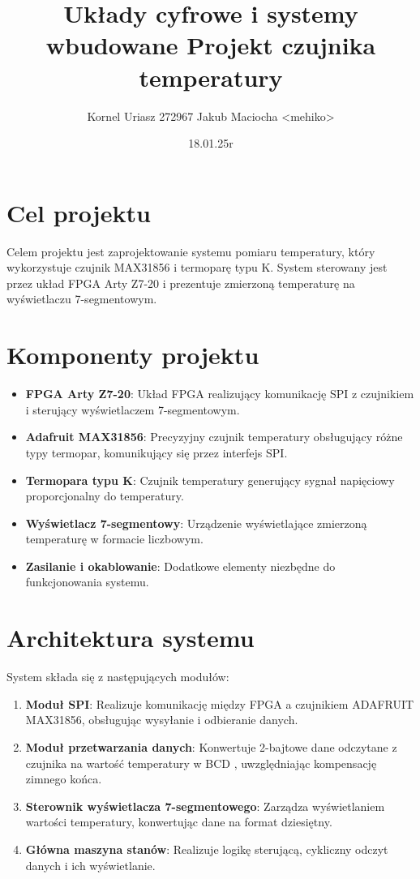 \documentclass[a4paper,12pt]{article}
\title{Układy cyfrowe i systemy wbudowane \newline Projekt czujnika temperatury}
\author{Kornel Uriasz 272967 \newline Jakub Maciocha <mehiko>}
\date{18.01.25r}
\begin{document}
\maketitle

\section{Cel projektu}
Celem projektu jest zaprojektowanie systemu pomiaru temperatury, który wykorzystuje czujnik MAX31856 i termoparę typu K. System sterowany jest przez układ FPGA Arty Z7-20 i prezentuje zmierzoną temperaturę na wyświetlaczu 7-segmentowym.

\section{Komponenty projektu}
\begin{itemize}
    \item \textbf{FPGA Arty Z7-20}: Układ FPGA realizujący komunikację SPI z czujnikiem i sterujący wyświetlaczem 7-segmentowym.
    \item \textbf{Adafruit MAX31856}: Precyzyjny czujnik temperatury obsługujący różne typy termopar, komunikujący się przez interfejs SPI.
    \item \textbf{Termopara typu K}: Czujnik temperatury generujący sygnał napięciowy proporcjonalny do temperatury.
    \item \textbf{Wyświetlacz 7-segmentowy}: Urządzenie wyświetlające zmierzoną temperaturę w formacie liczbowym.
    \item \textbf{Zasilanie i okablowanie}: Dodatkowe elementy niezbędne do funkcjonowania systemu.
\end{itemize}

\section{Architektura systemu}
System składa się z następujących modułów:
\begin{enumerate}
    \item \textbf{Moduł SPI}: Realizuje komunikację między FPGA a czujnikiem ADAFRUIT MAX31856, obsługując wysyłanie i odbieranie danych.
    \item \textbf{Moduł przetwarzania danych}: Konwertuje 2-bajtowe dane odczytane z czujnika na wartość temperatury w BCD , uwzględniając kompensację zimnego końca.
    \item \textbf{Sterownik wyświetlacza 7-segmentowego}: Zarządza wyświetlaniem wartości temperatury, konwertując dane na format dziesiętny.
    \item \textbf{Główna maszyna stanów}: Realizuje logikę sterującą, cykliczny odczyt danych i ich wyświetlanie.
\end{enumerate}
\end{document}
